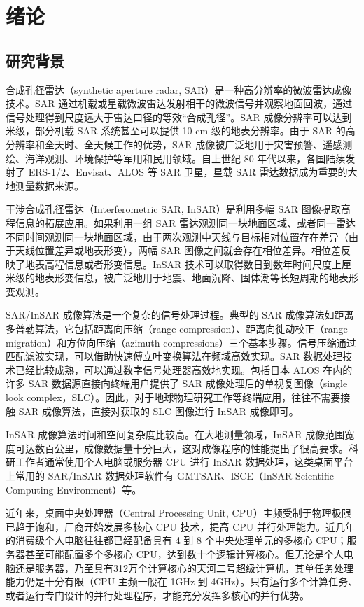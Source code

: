 \chapter{绪论}


\section{研究背景}

合成孔径雷达（synthetic aperture radar, SAR）是一种高分辨率的微波雷达成像技术。SAR 通过机载或星载微波雷达发射相干的微波信号并观察地面回波，通过信号处理得到尺度远大于雷达口径的等效“合成孔径”。SAR 成像分辨率可以达到米级，部分机载 SAR 系统甚至可以提供 10 cm 级的地表分辨率。由于 SAR 的高分辨率和全天时、全天候工作的优势，SAR 成像被广泛地用于灾害预警、遥感测绘、海洋观测、环境保护等军用和民用领域。自上世纪 80 年代以来，各国陆续发射了 ERS-1/2、Envisat、ALOS 等 SAR 卫星，星载 SAR 雷达数据成为重要的大地测量数据来源。

干涉合成孔径雷达（Interferometric SAR, InSAR）是利用多幅 SAR 图像提取高程信息的拓展应用。如果利用一组 SAR 雷达观测同一块地面区域、或者同一雷达不同时间观测同一块地面区域，由于两次观测中天线与目标相对位置存在差异（由于天线位置差异或地表形变），两幅 SAR 图像之间就会存在相位差异。相位差反映了地表高程信息或者形变信息。InSAR 技术可以取得数日到数年时间尺度上厘米级的地表形变信息，被广泛地用于地震、地面沉降、固体潮等长短周期的地表形变观测。

SAR/InSAR 成像算法是一个复杂的信号处理过程。典型的 SAR 成像算法如距离多普勒算法，它包括距离向压缩（range compression）、距离向徙动校正（range migration）和方位向压缩（azimuth compressions）三个基本步骤。信号压缩通过匹配滤波实现，可以借助快速傅立叶变换算法在频域高效实现。SAR 数据处理技术已经比较成熟，可以通过数字信号处理器高效地实现。包括日本 ALOS 在内的许多 SAR 数据源直接向终端用户提供了 SAR 成像处理后的单视复图像（single look complex，SLC）。因此，对于地球物理研究工作等终端应用，往往不需要接触 SAR 成像算法，直接对获取的 SLC 图像进行 InSAR 成像即可。

InSAR 成像算法时间和空间复杂度比较高。在大地测量领域，InSAR 成像范围宽度可达数百公里，成像数据量十分巨大，这对成像程序的性能提出了很高要求。科研工作者通常使用个人电脑或服务器 CPU 进行 InSAR 数据处理，这类桌面平台上常用的 SAR/InSAR 数据处理软件有 GMTSAR、ISCE（InSAR Scientific Computing Environment）等。

近年来，桌面中央处理器（Central Processing Unit, CPU）主频受制于物理极限已趋于饱和，厂商开始发展多核心 CPU 技术，提高 CPU 并行处理能力。近几年的消费级个人电脑往往都已经配备具有 4 到 8 个中央处理单元的多核心 CPU；服务器甚至可能配置多个多核心 CPU，达到数十个逻辑计算核心。但无论是个人电脑还是服务器，乃至具有312万个计算核心的天河二号超级计算机，其单任务处理能力仍是十分有限（CPU 主频一般在 1GHz 到 4GHz）。只有运行多个计算任务、或者运行专门设计的并行处理程序，才能充分发挥多核心的并行优势。

